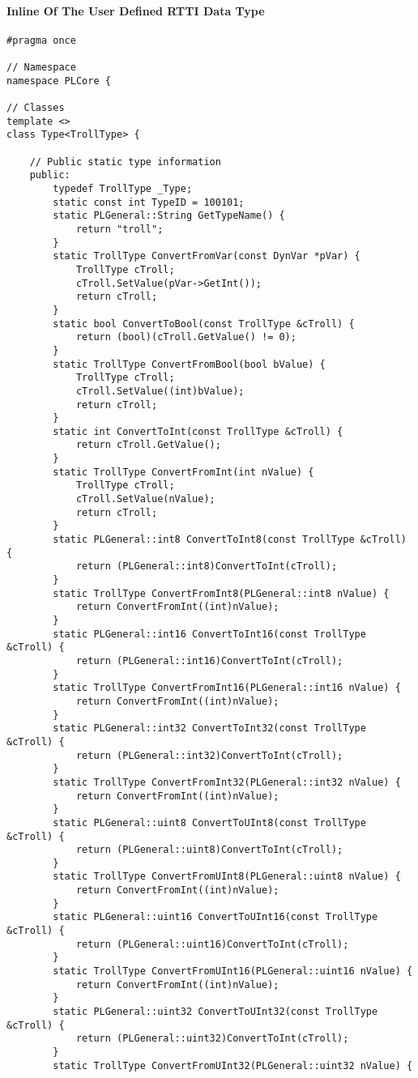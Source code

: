 \paragraph{Inline Of The User Defined RTTI Data Type}
\begin{lstlisting}[label=Code:UserDefinedRTTIDataTypeInline,caption={Inline of the user defined RTTI data type}]
#pragma once

// Namespace
namespace PLCore {

// Classes
template <>
class Type<TrollType> {

	// Public static type information
	public:
		typedef TrollType _Type;
		static const int TypeID = 100101;
		static PLGeneral::String GetTypeName() {
			return "troll";
		}
		static TrollType ConvertFromVar(const DynVar *pVar) {
			TrollType cTroll;
			cTroll.SetValue(pVar->GetInt());
			return cTroll;
		}
		static bool ConvertToBool(const TrollType &cTroll) {
			return (bool)(cTroll.GetValue() != 0);
		}
		static TrollType ConvertFromBool(bool bValue) {
			TrollType cTroll;
			cTroll.SetValue((int)bValue);
			return cTroll;
		}
		static int ConvertToInt(const TrollType &cTroll) {
			return cTroll.GetValue();
		}
		static TrollType ConvertFromInt(int nValue) {
			TrollType cTroll;
			cTroll.SetValue(nValue);
			return cTroll;
		}
		static PLGeneral::int8 ConvertToInt8(const TrollType &cTroll) {
			return (PLGeneral::int8)ConvertToInt(cTroll);
		}
		static TrollType ConvertFromInt8(PLGeneral::int8 nValue) {
			return ConvertFromInt((int)nValue);
		}
		static PLGeneral::int16 ConvertToInt16(const TrollType &cTroll) {
			return (PLGeneral::int16)ConvertToInt(cTroll);
		}
		static TrollType ConvertFromInt16(PLGeneral::int16 nValue) {
			return ConvertFromInt((int)nValue);
		}
		static PLGeneral::int32 ConvertToInt32(const TrollType &cTroll) {
			return (PLGeneral::int32)ConvertToInt(cTroll);
		}
		static TrollType ConvertFromInt32(PLGeneral::int32 nValue) {
			return ConvertFromInt((int)nValue);
		}
		static PLGeneral::uint8 ConvertToUInt8(const TrollType &cTroll) {
			return (PLGeneral::uint8)ConvertToInt(cTroll);
		}
		static TrollType ConvertFromUInt8(PLGeneral::uint8 nValue) {
			return ConvertFromInt((int)nValue);
		}
		static PLGeneral::uint16 ConvertToUInt16(const TrollType &cTroll) {
			return (PLGeneral::uint16)ConvertToInt(cTroll);
		}
		static TrollType ConvertFromUInt16(PLGeneral::uint16 nValue) {
			return ConvertFromInt((int)nValue);
		}
		static PLGeneral::uint32 ConvertToUInt32(const TrollType &cTroll) {
			return (PLGeneral::uint32)ConvertToInt(cTroll);
		}
		static TrollType ConvertFromUInt32(PLGeneral::uint32 nValue) {

\end{lstlisting}
